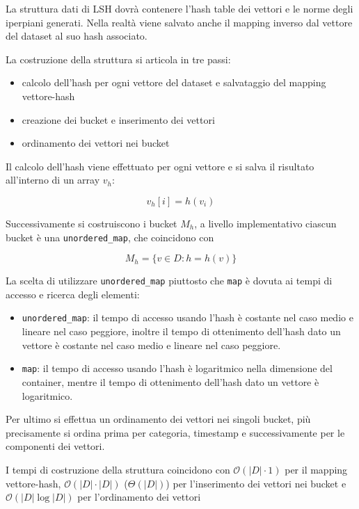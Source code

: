 La struttura dati di LSH dovrà contenere l'hash table dei vettori e le norme degli 
iperpiani generati.
Nella realtà viene salvato anche il mapping inverso dal vettore del dataset al 
suo hash associato.

La costruzione della struttura si articola in tre passi:
\begin{itemize}
    \item calcolo dell'hash per ogni vettore del dataset e salvataggio del mapping 
    vettore-hash
    \item creazione dei bucket e inserimento dei vettori
    \item ordinamento dei vettori nei bucket
\end{itemize}

Il calcolo dell'hash viene effettuato per ogni vettore e si salva il risultato 
all'interno di un array $v_h$:

$$v_h[i] = h(v_i)$$

Successivamente si costruiscono i bucket $M_h$, a livello implementativo ciascun bucket 
è una \texttt{unordered\_map}, che coincidono con 

$$M_h = \{v\in D : h = h(v)\}$$

\begin{nota}
    La scelta di utilizzare \texttt{unordered\_map} piuttosto che \texttt{map} è dovuta ai tempi di 
    accesso e ricerca degli elementi:
    \begin{itemize}
        \item \texttt{unordered\_map}: il tempo di accesso usando l'hash è costante 
        nel caso medio e lineare nel caso peggiore, inoltre il tempo di ottenimento dell'hash 
        dato un vettore è costante nel caso medio e lineare nel caso peggiore. \cite{unsorted_map_index}\cite{unsorted_map_find}
        \item \texttt{map}: il tempo di accesso usando l'hash è logaritmico nella dimensione 
        del container, mentre il tempo di ottenimento dell'hash dato un vettore è
        logaritmico. \cite{map_index}\cite{map_find}
    \end{itemize}
\end{nota}

Per ultimo si effettua un ordinamento dei vettori nei singoli bucket, più precisamente
si ordina prima per categoria, timestamp e successivamente per le componenti dei vettori.

I tempi di costruzione della struttura coincidono con $\mathcal{O}(|D|\cdot 1)$
per il mapping vettore-hash, $\mathcal{O}(|D|\cdot |D|)$ ($\Theta(|D|)$) per l'inserimento 
dei vettori nei bucket e $\mathcal{O}(|D|\log |D|)$ per l'ordinamento dei vettori 

